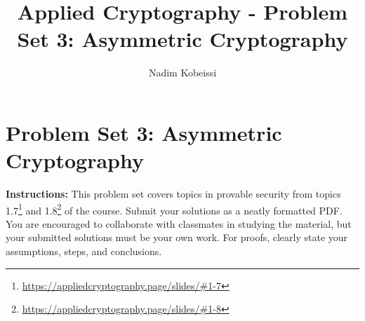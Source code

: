 \documentclass[10pt,a4paper,american]{exam}
\title{Applied Cryptography - Problem Set 3: Asymmetric Cryptography}
\author{Nadim Kobeissi}
\begin{document}
\classhandoutheader
\section*{Problem Set 3: Asymmetric Cryptography}

\begin{tcolorbox}[colframe=OliveGreen!30!white,colback=OliveGreen!5!white]
	\textbf{Instructions:} This problem set covers topics in provable security from topics 1.7\footnote{\url{https://appliedcryptography.page/slides/\#1-7}} and 1.8\footnote{\url{https://appliedcryptography.page/slides/\#1-8}} of the course. Submit your solutions as a neatly formatted PDF. You are encouraged to collaborate with classmates in studying the material, but your submitted solutions must be your own work. For proofs, clearly state your assumptions, steps, and conclusions.
\end{tcolorbox}
\end{document}
